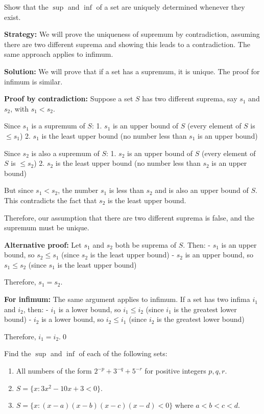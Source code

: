 \begin{problembox}
\begin{problemstatement}
Show that the $\sup$ and $\inf$ of a set are uniquely determined whenever they exist.
\end{problemstatement}
\end{problembox}

\noindent\textbf{Strategy:} We will prove the uniqueness of supremum by contradiction, assuming there are two different suprema and showing this leads to a contradiction. The same approach applies to infimum.

\bigskip\noindent\textbf{Solution:}
We will prove that if a set has a supremum, it is unique. The proof for infimum is similar.

\textbf{Proof by contradiction:}
Suppose a set $S$ has two different suprema, say $s_1$ and $s_2$, with $s_1 < s_2$.

Since $s_1$ is a supremum of $S$:
1. $s_1$ is an upper bound of $S$ (every element of $S$ is $\leq s_1$)
2. $s_1$ is the least upper bound (no number less than $s_1$ is an upper bound)

Since $s_2$ is also a supremum of $S$:
1. $s_2$ is an upper bound of $S$ (every element of $S$ is $\leq s_2$)
2. $s_2$ is the least upper bound (no number less than $s_2$ is an upper bound)

But since $s_1 < s_2$, the number $s_1$ is less than $s_2$ and is also an upper bound of $S$. This contradicts the fact that $s_2$ is the least upper bound.

Therefore, our assumption that there are two different suprema is false, and the supremum must be unique.

\textbf{Alternative proof:}
Let $s_1$ and $s_2$ both be suprema of $S$. Then:
- $s_1$ is an upper bound, so $s_2 \leq s_1$ (since $s_2$ is the least upper bound)
- $s_2$ is an upper bound, so $s_1 \leq s_2$ (since $s_1$ is the least upper bound)

Therefore, $s_1 = s_2$.

\textbf{For infimum:}
The same argument applies to infimum. If a set has two infima $i_1$ and $i_2$, then:
- $i_1$ is a lower bound, so $i_1 \leq i_2$ (since $i_1$ is the greatest lower bound)
- $i_2$ is a lower bound, so $i_2 \leq i_1$ (since $i_2$ is the greatest lower bound)

Therefore, $i_1 = i_2$.\qed


\begin{problembox}
\begin{problemstatement}
Find the $\sup$ and $\inf$ of each of the following sets:
\begin{enumerate}[label=(\alph*)]
\item All numbers of the form $2^{-p} + 3^{-q} + 5^{-r}$ for positive integers $p, q, r$.
\item $S = \{x : 3x^2 - 10x + 3 < 0\}$.
\item $S = \{x : (x - a)(x - b)(x - c)(x - d) < 0\}$ where $a < b < c < d$.
\end{enumerate}
\end{problemstatement}
\end{problembox}


